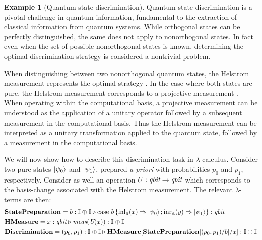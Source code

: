 \documentclass[10pt,a4paper]{amsart}
\theoremstyle{definition}
\theoremstyle{definition}
\newtheorem{example}[definition]{Example}
\theoremstyle{definition}
\theoremstyle{definition}
\theoremstyle{definition}
\theoremstyle{definition}
\begin{document}
\begin{example}[Quantum state discrimination]

Quantum state discrimination is a pivotal challenge in quantum information,
fundamental to the extraction of classical information from quantum systems.
While orthogonal states can be perfectly distinguished, the same does not apply
to nonorthogonal states. In fact even when the set of possible nonorthogonal
states is known, determining the optimal discrimination strategy is considered
a nontrivial problem.

When distinguishing between two nonorthogonal quantum states, the Helstrom
measurement represents the optimal strategy
\cite{helstromQuantumDetectionEstimation1976}. In the case where both states
are pure, the Helstrom measurement corresponds to a projective measurement
\cite{barnett2009quantum}.  When operating within the computational basis, a
projective measurement can be understood as the application of a unitary
operator followed by a subsequent measurement in the computational basis. Thus
the Helstrom measurement can be interpreted as a unitary transformation applied
to the quantum state, followed by a measurement in the computational basis. 

We will now show how to describe this discrimination task in
$\lambda$-calculus.  Consider two pure states $\ket{\psi_0}$ and
$\ket{\psi_1}$, prepared \emph{a priori} with probabilities $p_0$ and $p_1$,
respectively. Consider as well an operation $U : \emph{qbit} \to \emph{qbit}$ which
corresponds to the basis-change associated with the Helstrom measurement.
The relevant $\lambda$-terms are then:
\begin{align*}
  &\textbf{StatePreparation} =  b: \mathbb{I} \oplus \mathbb{I}  \triangleright  \text{case } b\,
  \{\mathrm{inl}_{\mathbb{B}}(x) \Rightarrow \ket{\psi_0} ; \mathrm{inr}_{\mathbb{A}}(y) \Rightarrow \ket{\psi_1}\}: \textit{qbit} \\
  &\textbf{HMeasure} =  x : \emph{qbit} \triangleright \emph{meas} (\emph{U}(x)): \mathbb{I} \oplus \mathbb{I} \\
  &\textbf{Discrimination} = (p_0,p_1): \mathbb{I} \oplus \mathbb{I}  \triangleright \textbf{HMeasure} [ \textbf{StatePreparation} [(p_0,p_1)/ b] / x] : \mathbb{I} \oplus \mathbb{I}
\end{align*}
\end{example}
\end{document}
